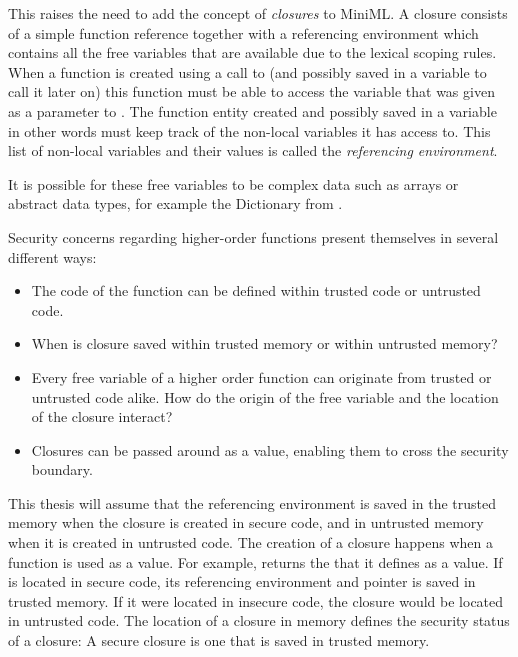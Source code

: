 %


This raises the need to add the concept of \emph{closures} to \mbox{MiniML}.
A closure consists of a simple function reference together with a referencing environment which contains all the free variables that are available due to the lexical scoping rules.
When a function is created using a call to  (and possibly saved in a variable to call it later on) this function must be able to access the variable  that was given as a parameter to .
The function entity created and possibly saved in a variable in other words must keep track of the non-local variables it has access to.
This list of non-local variables and their values is called the \emph{referencing environment}.

It is possible for these free variables to be complex data such as arrays or abstract data types, for example the Dictionary from . 

Security concerns regarding higher-order functions present themselves in several different ways:

\begin{itemize}
\item The code of the function can be defined within trusted code or untrusted code.
\item When is closure saved within trusted memory or within untrusted memory?
\item Every free variable of a higher order function can originate from trusted or untrusted code alike.
How do the origin of the free variable and the location of the closure interact?
\item Closures can be passed around as a value, enabling them to cross the security boundary.
\end{itemize}

This thesis will assume that the referencing environment is saved in the trusted memory when the closure is created in secure code, and in untrusted memory when it is created in untrusted code.
The creation of a closure happens when a function is used as a value.
For example,  returns the  that it defines as a value.
If  is located in secure code, its referencing environment and pointer is saved in trusted memory.
If it were located in insecure code, the closure would be located in untrusted code.
The location of a closure in memory defines the security status of a closure: A secure closure is one that is saved in trusted memory.

